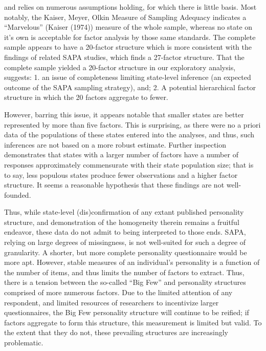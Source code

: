 \documentclass[
  english,
  man]{apa6}
\begin{document}
and relies on numerous assumptions holding, for which there is little basis. Most notably, the Kaiser, Meyer, Olkin Measure of Sampling Adequacy indicates a ``Marvelous'' (Kaiser (1974)) measure of the whole sample, whereas no state on it's own is acceptable for factor analysis by those same standards. The complete sample appears to have a 20-factor structure which is more consistent with the findings of related SAPA studies, which finds a 27-factor structure. That the complete sample yielded a 20-factor structure in our exploratory analysis, suggests: 1. an issue of completeness limiting state-level inference (an expected outcome of the SAPA sampling strategy), and; 2. A potential hierarchical factor structure in which the 20 factors aggregate to fewer.

However, barring this issue, it appears notable that smaller states are better represented by more than five factors. This is surprising, as there were no a priori data of the populations of these states entered into the analyses, and thus, such inferences are not based on a more robust estimate. Further inspection demonstrates that states with a larger number of factors have a number of responses approximately commensurate with their state population size; that is to say, less populous states produce fewer observations and a higher factor structure. It seems a reasonable hypothesis that these findings are not well-founded.

Thus, while state-level (dis)confirmation of any extant published personality structure, and demonstration of the homogeneity therein remains a fruitful endeavor, these data do not admit to being interpreted to those ends. SAPA, relying on large degrees of missingness, is not well-suited for such a degree of granularity. A shorter, but more complete personality questionnaire would be more apt. However, stable measures of an individual's personality is a function of the number of items, and thus limits the number of factors to extract. Thus, there is a tension between the so-called ``Big Few'' and personality structures comprised of more numerous factors. Due to the limited attention of any respondent, and limited resources of researchers to incentivize larger questionnaires, the Big Few personality structure will continue to be reified; if factors aggregate to form this structure, this measurement is limited but valid. To the extent that they do not, these prevailing structures are increasingly problematic.

\newpage
\end{document}
